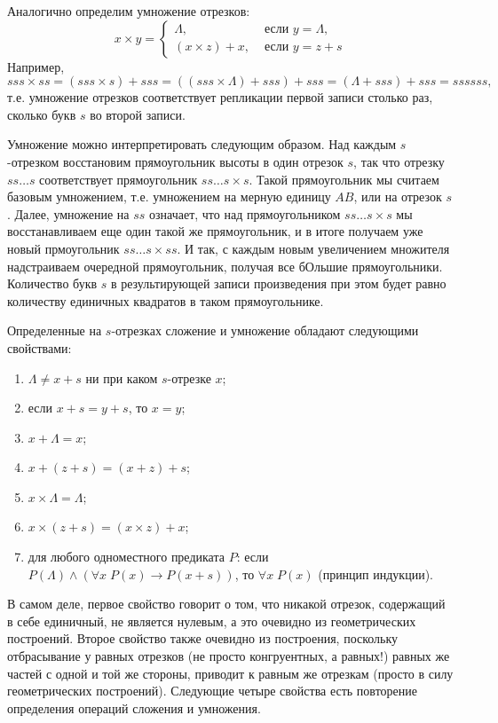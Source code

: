 Аналогично определим умножение отрезков:
$$
x\times y = 
\begin{cases}
\Lambda, & \mbox{ если }y=\Lambda,\\
(x\times z) + x, & \mbox{ если }y=z+s
\end{cases}
$$
Например,
$$
sss\times ss = (sss\times s) + sss = ((sss\times\Lambda) + sss)+sss = (\Lambda + sss) + sss=ssssss,
$$
т.е. умножение отрезков соответствует репликации первой записи столько раз, сколько букв $s$ во второй записи.


Умножение можно интерпретировать следующим образом. Над каждым $s$-отрезком восстановим прямоугольник высоты в один отрезок $s$, так что отрезку $ss\dots s$ соответствует прямоугольник $ss\dots s\times s$. Такой прямоугольник мы считаем базовым умножением, т.е. умножением на мерную единицу $AB$, или на отрезок $s$. Далее, умножение на $ss$ означает, что над прямоугольником $ss\dots s\times s$ мы восстанавливаем еще один такой же прямоугольник, и в итоге получаем уже новый прмоугольник $ss\dots s\times ss$. И так, с каждым новым увеличением множителя надстраиваем очередной прямоугольник, получая все бОльшие прямоугольники. Количество букв $s$ в результирующей записи произведения при этом будет равно количеству единичных квадратов в таком прямоугольнике.


Определенные на $s$-отрезках сложение и умножение обладают следующими свойствами:
\begin{enumerate}[I]
\item $\Lambda\ne x+s$ ни при каком $s$-отрезке $x$;
\item если $x+s=y+s$, то $x=y$;
\item $x+\Lambda=x$;
\item $x+(z+s)=(x+z)+s$;
\item $x\times \Lambda=\Lambda$;
\item $x\times(z+s)=(x\times z)+x$;
\item для любого одноместного предиката $P$: если $P(\Lambda)\land(\forall x \; P(x)\to P(x+s))$, то $\forall x\; P(x)$ (принцип индукции).
\end{enumerate}

В самом деле, первое свойство говорит о том, что никакой отрезок, содержащий в себе единичный, не является нулевым, а это очевидно из геометрических построений. Второе свойство также очевидно из построения, поскольку отбрасывание у равных отрезков (не просто конгруентных, а равных!) равных же частей с одной и той же стороны, приводит к равным же отрезкам (просто в силу геометрических построений). Следующие четыре свойства есть повторение определения операций сложения и умножения.

